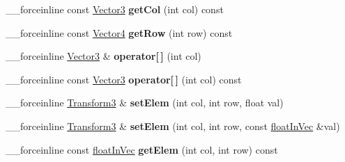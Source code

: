 \begin{DoxyCompactItemize}
\item 
\hypertarget{classVectormath_1_1Aos_1_1Transform3_a5e5cfd956584287015f6a7bb480e937a}{\-\_\-\-\_\-forceinline const \hyperlink{classVectormath_1_1Aos_1_1Vector3}{Vector3} {\bfseries get\-Col} (int col) const }\label{classVectormath_1_1Aos_1_1Transform3_a5e5cfd956584287015f6a7bb480e937a}

\item 
\hypertarget{classVectormath_1_1Aos_1_1Transform3_a37e39268fdc5ab73c66482631e04c2be}{\-\_\-\-\_\-forceinline const \hyperlink{classVectormath_1_1Aos_1_1Vector4}{Vector4} {\bfseries get\-Row} (int row) const }\label{classVectormath_1_1Aos_1_1Transform3_a37e39268fdc5ab73c66482631e04c2be}

\item 
\hypertarget{classVectormath_1_1Aos_1_1Transform3_a7d728c862eca20b7dd7c786bbc270b7a}{\-\_\-\-\_\-forceinline \hyperlink{classVectormath_1_1Aos_1_1Vector3}{Vector3} \& {\bfseries operator\mbox{[}$\,$\mbox{]}} (int col)}\label{classVectormath_1_1Aos_1_1Transform3_a7d728c862eca20b7dd7c786bbc270b7a}

\item 
\hypertarget{classVectormath_1_1Aos_1_1Transform3_ac610e1f43245f2fdf0634cb8bd2bb1e5}{\-\_\-\-\_\-forceinline const \hyperlink{classVectormath_1_1Aos_1_1Vector3}{Vector3} {\bfseries operator\mbox{[}$\,$\mbox{]}} (int col) const }\label{classVectormath_1_1Aos_1_1Transform3_ac610e1f43245f2fdf0634cb8bd2bb1e5}

\item 
\hypertarget{classVectormath_1_1Aos_1_1Transform3_a92c6c613b16998caee3779345e48f733}{\-\_\-\-\_\-forceinline \hyperlink{classVectormath_1_1Aos_1_1Transform3}{Transform3} \& {\bfseries set\-Elem} (int col, int row, float val)}\label{classVectormath_1_1Aos_1_1Transform3_a92c6c613b16998caee3779345e48f733}

\item 
\hypertarget{classVectormath_1_1Aos_1_1Transform3_af3ab426f388d194b24ffdb352da73c38}{\-\_\-\-\_\-forceinline \hyperlink{classVectormath_1_1Aos_1_1Transform3}{Transform3} \& {\bfseries set\-Elem} (int col, int row, const \hyperlink{classVectormath_1_1floatInVec}{float\-In\-Vec} \&val)}\label{classVectormath_1_1Aos_1_1Transform3_af3ab426f388d194b24ffdb352da73c38}

\item 
\hypertarget{classVectormath_1_1Aos_1_1Transform3_a8fc4b3fbc0428e8301dc13ee0d952e00}{\-\_\-\-\_\-forceinline const \hyperlink{classVectormath_1_1floatInVec}{float\-In\-Vec} {\bfseries get\-Elem} (int col, int row) const }\label{classVectormath_1_1Aos_1_1Transform3_a8fc4b3fbc0428e8301dc13ee0d952e00}


\end{DoxyCompactItemize}
